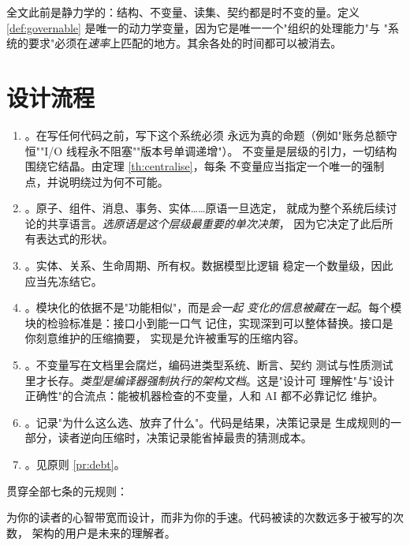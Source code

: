 \begin{remark}[本章的动力学是唯一的]\label{rmk:only-dynamics}
全文此前是静力学的：结构、不变量、读集、契约都是时不变的量。定义
\ref{def:governable} 是唯一的动力学变量，因为它是唯一一个"组织的处理能力"与
"系统的要求"必须在\emph{速率}上匹配的地方。其余各处的时间都可以被消去。
\end{remark}

\section{设计流程}\label{sec:seven-steps}

\begin{enumerate}[label=(D\arabic*)]
\item {}。在写任何代码之前，写下这个系统必须
      永远为真的命题（例如"账务总额守恒""I/O 线程永不阻塞""版本号单调递增"）。
      不变量是层级的引力，一切结构围绕它结晶。由定理 \ref{th:centralise}，每条
      不变量应当指定一个唯一的强制点，并说明绕过为何不可能。
\item {}。原子、组件、消息、事务、实体……原语一旦选定，
      就成为整个系统后续讨论的共享语言。\emph{选原语是这个层级最重要的单次决策}，
      因为它决定了此后所有表达式的形状。
\item {}。实体、关系、生命周期、所有权。数据模型比逻辑
      稳定一个数量级，因此应当先冻结它。
\item {}。模块化的依据不是"功能相似"，而是\emph{会一起
      变化的信息被藏在一起}\cite{parnas1972}。每个模块的检验标准是：接口小到能一口气
      记住，实现深到可以整体替换\cite{ousterhout2018}。接口是你刻意维护的压缩摘要，
      实现是允许被重写的压缩内容。
\item {}。不变量写在文档里会腐烂，编码进类型系统、断言、契约
      测试与性质测试里才长存。\emph{类型是编译器强制执行的架构文档}。这是"设计可
      理解性"与"设计正确性"的合流点：能被机器检查的不变量，人和 AI 都不必靠记忆
      维护。
\item {}。记录"为什么这么选、放弃了什么"。代码是结果，决策记录是
      生成规则的一部分，读者逆向压缩时，决策记录能省掉最贵的猜测成本。
\item {}。见原则 \ref{pr:debt}。
\end{enumerate}

贯穿全部七条的元规则：

\begin{principle}[为读者的心智带宽设计]\label{pr:reader}
为你的读者的心智带宽而设计，而非为你的手速。代码被读的次数远多于被写的次数，
架构的用户是未来的理解者。
\end{principle}

